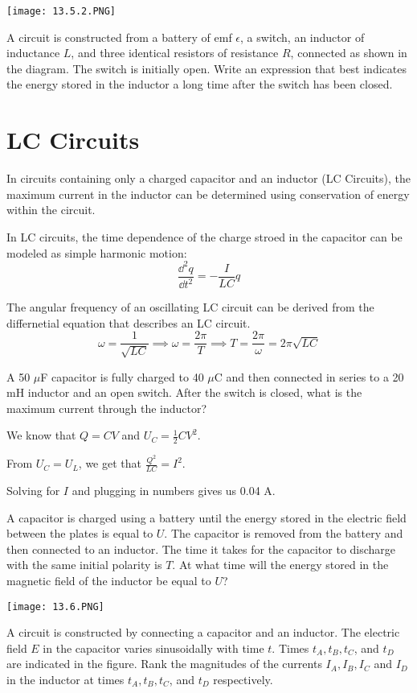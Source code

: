 \documentclass[../em.tex]{subfiles}
\begin{document}
\pagebreak
\ex \begin{center}
    \texttt{[image: 13.5.2.PNG]}
\end{center}
A circuit is constructed from a battery of emf $\epsilon$, a switch, an inductor of inductance $L$, and three identical resistors of resistance $R$, connected as shown in the diagram. The switch is initially open.
Write an expression that best indicates the energy stored in the inductor a long time after the switch has been closed.

\section{LC Circuits}
In circuits containing only a charged capacitor and an inductor (LC Circuits), the maximum current in the inductor 
can be determined using conservation of energy within the circuit.

In LC circuits, the time dependence of the charge stroed in the capacitor can be modeled as simple harmonic motion:
\[ \frac{\dd^2 q}{\dd t^2} = -\frac{I}{LC}q \]

The angular frequency of an oscillating LC circuit can be derived from the differnetial equation that describes an LC circuit.
\[ \omega = \frac{1}{\sqrt{LC}} \implies \omega = \frac{2\pi}{T} \implies T = \frac{2\pi}{\omega} = 2\pi\sqrt{LC}\]

\begin{example}
    A 50 $\mu$F capacitor is fully charged to 40 $\mu$C and then connected in series to a 20 mH inductor and an open switch. After the switch is closed, what is the maximum current through the inductor?

    We know that $Q=CV$ and $U_C=\frac{1}{2}CV^2$.

    From $U_C=U_L$, we get that $\frac{Q^2}{LC}=I^2$.

    Solving for $I$ and plugging in numbers gives us 0.04 A.
\end{example}

\ex A capacitor is charged using a battery until the energy stored in the electric field between the plates is equal to $U$. The capacitor is removed from the battery and then connected to an inductor.
The time it takes for the capacitor to discharge with the same initial polarity is $T$. At what time will the energy stored in the magnetic field of the inductor be equal to $U$?

\pagebreak
\ex \begin{center}
    \texttt{[image: 13.6.PNG]}
\end{center}
A circuit is constructed by connecting a capacitor and an inductor. The electric field $E$ in the capacitor varies sinusoidally with time $t$. Times $t_A, t_B, t_C$, and $t_D$ are indicated in the figure.
Rank the magnitudes of the currents $I_A, I_B, I_C$ and $I_D$ in the inductor at times $t_A, t_B, t_C$, and $t_D$ respectively.
\end{document}
